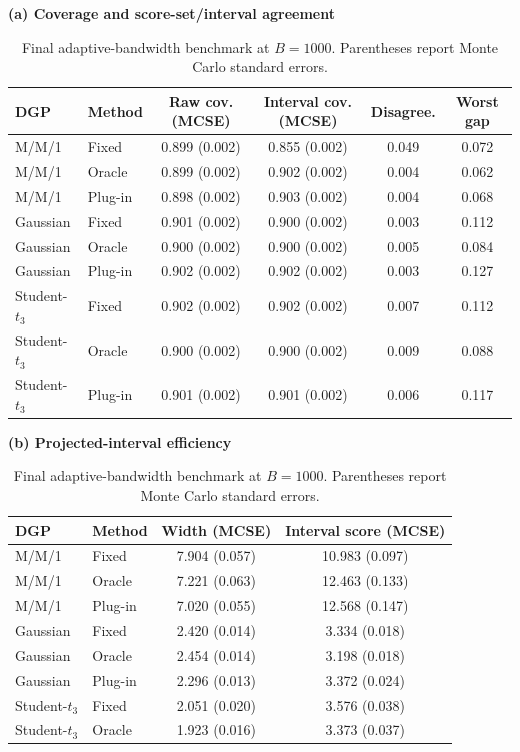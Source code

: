 \begin{table}[p]
\centering
\caption{Final adaptive-bandwidth benchmark at $B=1000$. Parentheses report Monte Carlo standard errors.}
\label{tab:final-adaptive-h}
\textbf{(a) Coverage and score-set/interval agreement}\par\smallskip
\small
\begin{tabular}{@{}llcccc@{}}
\toprule
DGP & Method & Raw cov. (MCSE) & Interval cov. (MCSE) & Disagree. & Worst gap \\
\midrule
M/M/1 & Fixed & 0.899 (0.002) & 0.855 (0.002) & 0.049 & 0.072 \\
M/M/1 & Oracle & 0.899 (0.002) & 0.902 (0.002) & 0.004 & 0.062 \\
M/M/1 & Plug-in & 0.898 (0.002) & 0.903 (0.002) & 0.004 & 0.068 \\
Gaussian & Fixed & 0.901 (0.002) & 0.900 (0.002) & 0.003 & 0.112 \\
Gaussian & Oracle & 0.900 (0.002) & 0.900 (0.002) & 0.005 & 0.084 \\
Gaussian & Plug-in & 0.902 (0.002) & 0.902 (0.002) & 0.003 & 0.127 \\
Student-$t_3$ & Fixed & 0.902 (0.002) & 0.902 (0.002) & 0.007 & 0.112 \\
Student-$t_3$ & Oracle & 0.900 (0.002) & 0.900 (0.002) & 0.009 & 0.088 \\
Student-$t_3$ & Plug-in & 0.901 (0.002) & 0.901 (0.002) & 0.006 & 0.117 \\
\bottomrule
\end{tabular}
\par\medskip
\textbf{(b) Projected-interval efficiency}\par\smallskip
\begin{tabular}{@{}llcc@{}}
\toprule
DGP & Method & Width (MCSE) & Interval score (MCSE) \\
\midrule
M/M/1 & Fixed & 7.904 (0.057) & 10.983 (0.097) \\
M/M/1 & Oracle & 7.221 (0.063) & 12.463 (0.133) \\
M/M/1 & Plug-in & 7.020 (0.055) & 12.568 (0.147) \\
Gaussian & Fixed & 2.420 (0.014) & 3.334 (0.018) \\
Gaussian & Oracle & 2.454 (0.014) & 3.198 (0.018) \\
Gaussian & Plug-in & 2.296 (0.013) & 3.372 (0.024) \\
Student-$t_3$ & Fixed & 2.051 (0.020) & 3.576 (0.038) \\
Student-$t_3$ & Oracle & 1.923 (0.016) & 3.373 (0.037) \\

\end{tabular}
\end{table}
